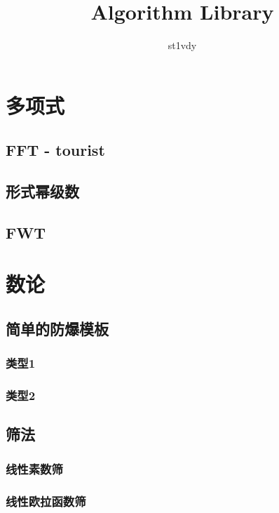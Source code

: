 \documentclass{article}
\title{Algorithm Library}
\author{st1vdy}
\begin{document}
\begin{titlepage}
\maketitle
\thispagestyle{empty}
\pagebreak
\pagestyle{plain}
\tableofcontents
\end{titlepage}
\newpage %
\section{多项式} %
\subsection{FFT - tourist}

\subsection{形式幂级数}

\subsection{FWT}


\section{数论}
\subsection{简单的防爆模板}
\subsubsection{类型1}

\subsubsection{类型2}

\subsection{筛法}
\subsubsection{线性素数筛}

\subsubsection{线性欧拉函数筛}

\end{document}
